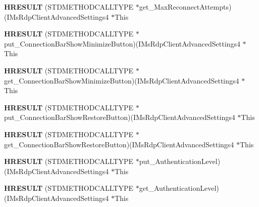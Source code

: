 \begin{DoxyCompactItemize}
{\bfseries H\+R\+E\+S\+U\+LT} (S\+T\+D\+M\+E\+T\+H\+O\+D\+C\+A\+L\+L\+T\+Y\+PE $\ast$get\+\_\+\+Max\+Reconnect\+Attempts)(I\+Ms\+Rdp\+Client\+Advanced\+Settings4 $\ast$This
\item 
\mbox{\label{struct_i_ms_rdp_client_advanced_settings4_vtbl_a10d2231b34162c3552ce8eb7a5fe09c3}} 
{\bfseries H\+R\+E\+S\+U\+LT} (S\+T\+D\+M\+E\+T\+H\+O\+D\+C\+A\+L\+L\+T\+Y\+PE $\ast$put\+\_\+\+Connection\+Bar\+Show\+Minimize\+Button)(I\+Ms\+Rdp\+Client\+Advanced\+Settings4 $\ast$This
\item 
\mbox{\label{struct_i_ms_rdp_client_advanced_settings4_vtbl_a2a264bfd6df0b36f8b11aa8ebefeff4b}} 
{\bfseries H\+R\+E\+S\+U\+LT} (S\+T\+D\+M\+E\+T\+H\+O\+D\+C\+A\+L\+L\+T\+Y\+PE $\ast$get\+\_\+\+Connection\+Bar\+Show\+Minimize\+Button)(I\+Ms\+Rdp\+Client\+Advanced\+Settings4 $\ast$This
\item 
\mbox{\label{struct_i_ms_rdp_client_advanced_settings4_vtbl_ae36005a0a3c24546e694efb285e2ea60}} 
{\bfseries H\+R\+E\+S\+U\+LT} (S\+T\+D\+M\+E\+T\+H\+O\+D\+C\+A\+L\+L\+T\+Y\+PE $\ast$put\+\_\+\+Connection\+Bar\+Show\+Restore\+Button)(I\+Ms\+Rdp\+Client\+Advanced\+Settings4 $\ast$This
\item 
\mbox{\label{struct_i_ms_rdp_client_advanced_settings4_vtbl_a230b4990735bf1d4f43891c5b3fa1b02}} 
{\bfseries H\+R\+E\+S\+U\+LT} (S\+T\+D\+M\+E\+T\+H\+O\+D\+C\+A\+L\+L\+T\+Y\+PE $\ast$get\+\_\+\+Connection\+Bar\+Show\+Restore\+Button)(I\+Ms\+Rdp\+Client\+Advanced\+Settings4 $\ast$This
\item 
\mbox{\label{struct_i_ms_rdp_client_advanced_settings4_vtbl_abaaf96893911bdb2d000eef252c0f0ce}} 
{\bfseries H\+R\+E\+S\+U\+LT} (S\+T\+D\+M\+E\+T\+H\+O\+D\+C\+A\+L\+L\+T\+Y\+PE $\ast$put\+\_\+\+Authentication\+Level)(I\+Ms\+Rdp\+Client\+Advanced\+Settings4 $\ast$This
\item 
\mbox{\label{struct_i_ms_rdp_client_advanced_settings4_vtbl_adddd71e71b6b0323a56a12329078d1d1}} 
{\bfseries H\+R\+E\+S\+U\+LT} (S\+T\+D\+M\+E\+T\+H\+O\+D\+C\+A\+L\+L\+T\+Y\+PE $\ast$get\+\_\+\+Authentication\+Level)(I\+Ms\+Rdp\+Client\+Advanced\+Settings4 $\ast$This
\end{DoxyCompactItemize}
